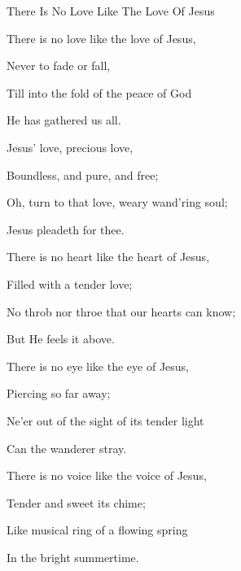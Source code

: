 \documentclass[12pt]{book}
\begin{document}
\begin{song}{There Is No Love Like The Love Of Jesus}{}
  {\SBPubDom}
  {}
  {}
  {}

  \begin{SBVerse}
    There is no love like the love of Jesus,

    Never to fade or fall,

    Till into the fold of the peace of God

    He has gathered us all.
  \end{SBVerse}

  \begin{SBOpGroup}
    Jesus' love, precious love,

    Boundless, and pure, and free;

    Oh, turn to that love, weary wand'ring soul;

    Jesus pleadeth for thee.
  \end{SBOpGroup}

  \begin{SBVerse}
    There is no heart like the heart of Jesus,

    Filled with a tender love;

    No throb nor throe that our hearts can know;

    But He feels it above.
  \end{SBVerse}

  \begin{SBVerse}
    There is no eye like the eye of Jesus,

    Piercing so far away;

    Ne'er out of the sight of its tender light

    Can the wanderer stray.
  \end{SBVerse}

  \begin{SBVerse}
    There is no voice like the voice of Jesus,

    Tender and sweet its chime;

    Like musical ring of a flowing spring

    In the bright summertime.
  \end{SBVerse}

\end{song}
\end{document}
